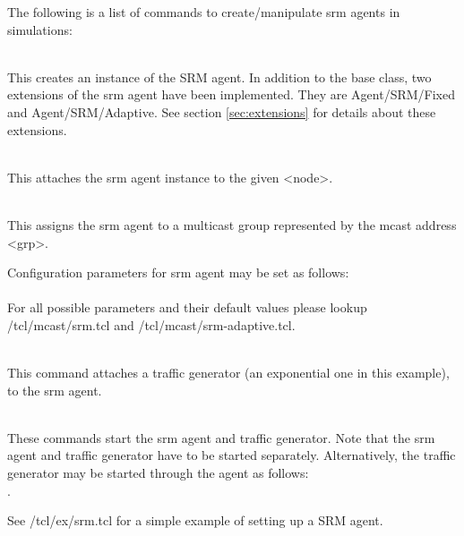 The following is a list of commands to create/manipulate srm agents in
simulations:
\begin{flushleft}
\\
This creates an instance of the SRM agent. In addition to the base class,
two extensions of the srm agent have been implemented. They are
Agent/SRM/Fixed and Agent/SRM/Adaptive. See section \ref{sec:extensions}
for details about these extensions.


\\
This attaches the srm agent instance to the given <node>.


 \\
This assigns the srm agent to a multicast group represented by the mcast
address <grp>.


Configuration parameters for srm agent may be set as follows:\\
\\
For all possible parameters and their default values please lookup \ns/tcl/mcast/srm.tcl
and \ns/tcl/mcast/srm-adaptive.tcl.


\\
This command attaches a traffic generator (an exponential one in this example),
to the srm agent.

\\
These commands start the srm agent and traffic generator. Note that the srm
agent and traffic generator have to be started separately. Alternatively, the
traffic generator may be started through the agent as follows:\\
.

See \ns/tcl/ex/srm.tcl for a simple example of setting up a SRM agent.

\end{flushleft}

\endinput

### Local Variables:
### mode: latex
### comment-column: 60
### backup-by-copying-when-linked: t
### file-precious-flag: nil
### End:
